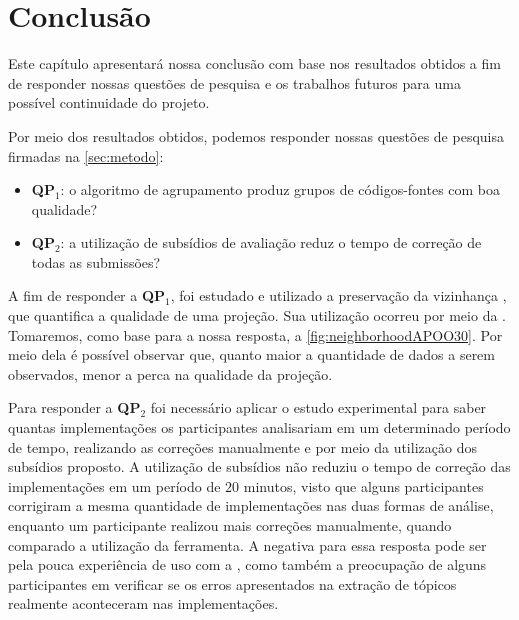 \chapter{Conclusão}
\label{chap:Conclusao}

	Este capítulo apresentará nossa conclusão com base nos resultados obtidos a fim de
	responder nossas questões de pesquisa e os trabalhos futuros para uma possível
	continuidade do projeto.
	
	Por meio dos resultados obtidos, podemos responder nossas questões de pesquisa
	firmadas na \cref{sec:metodo}:
	
	\begin{itemize}
		\item \textbf{QP$_1$}: o algoritmo de agrupamento produz grupos de códigos-fontes
		com boa qualidade?
		\item \textbf{QP$_2$}: a utilização de subsídios de avaliação reduz o tempo
		de correção de todas as submissões?
	\end{itemize}
	
	A fim de responder a \textbf{QP$_1$}, foi estudado e utilizado a preservação
	da vizinhança \cite{paulovich2008hipp}, que quantifica a qualidade de uma projeção.
	Sua utilização ocorreu por meio da . Tomaremos, como base
	para a nossa resposta, a \cref{fig:neighborhoodAPOO30}. Por meio dela é possível
	observar que, quanto maior a quantidade de dados a serem observados, menor a perca
	na qualidade da projeção.
	
	Para responder a \textbf{QP$_2$} foi necessário aplicar o estudo experimental
	para saber quantas implementações os participantes analisariam em um determinado
	período de tempo, realizando as correções manualmente e por meio da utilização dos
	subsídios proposto. A utilização de subsídios não reduziu o tempo de correção
	das implementações em um período de $20$ minutos, visto que alguns participantes
	corrigiram a mesma quantidade de implementações nas duas formas de análise, enquanto
	um participante realizou mais correções manualmente, quando comparado a utilização
	da ferramenta. A negativa para essa resposta pode ser pela pouca experiência de uso
	com a , como também a preocupação de alguns participantes em
	verificar se os erros apresentados na extração de tópicos realmente aconteceram
	nas implementações.
	
